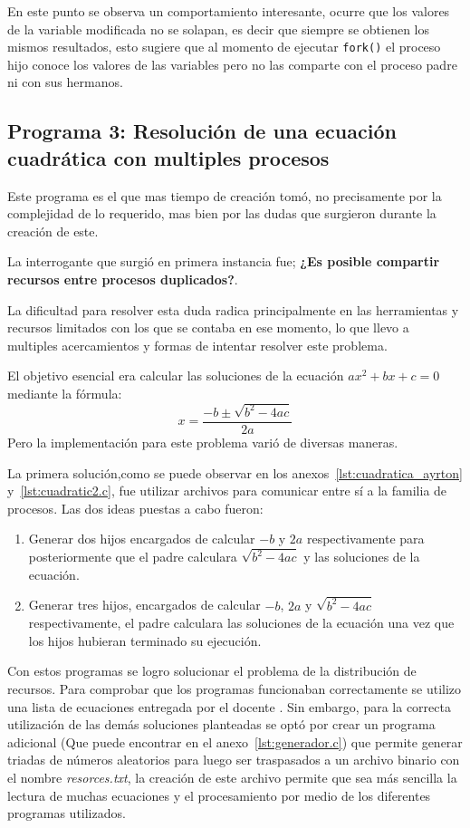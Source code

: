 En este punto se observa un comportamiento interesante, ocurre que los valores de la variable modificada no se solapan, es decir que siempre se obtienen los mismos resultados, esto sugiere que al momento de ejecutar \verb|fork()| el proceso hijo conoce los valores de las variables pero no las comparte con el proceso padre ni con sus hermanos.
\subsection{Programa 3: Resolución de una ecuación cuadrática con multiples procesos}
Este programa es el que mas tiempo de creación tomó, no precisamente por la complejidad de lo requerido, mas bien por las dudas que surgieron durante la creación de este.

La interrogante que surgió en primera instancia fue; \textbf{¿Es posible compartir recursos entre procesos duplicados?}.

La dificultad para resolver esta duda radica principalmente en las herramientas y recursos limitados con los que se contaba en ese momento, lo que llevo a multiples acercamientos y formas de intentar resolver este problema.

    El objetivo esencial era calcular las soluciones de la ecuación $ax^2+bx+c=0$ mediante la fórmula: \[x=\frac{-b\pm \sqrt{b^2-4ac}}{2a}\]Pero la implementación para este problema varió de diversas maneras.

La primera solución,como se puede observar en los anexos~\ref{lst:cuadratica_ayrton} y~\ref{lst:cuadratic2.c}, fue utilizar archivos para comunicar entre sí a la familia de procesos. Las dos ideas puestas a cabo fueron:
\begin{enumerate}
    \item Generar dos hijos encargados de calcular $-b$ y $2a$ respectivamente para posteriormente que el padre calculara $\sqrt{b^2-4ac}$ y las soluciones de la ecuación.
    \item Generar tres hijos, encargados de calcular $-b$, $2a$ y $\sqrt{b^2-4ac}$ respectivamente, el padre calculara las soluciones de la ecuación una vez que los hijos hubieran terminado su ejecución.
\end{enumerate}

Con estos programas se logro solucionar el problema de la distribución de recursos. Para comprobar que los programas funcionaban correctamente se utilizo una lista de ecuaciones entregada por el docente \docprofessor. Sin embargo, para la correcta utilización de las demás soluciones planteadas se optó por crear un programa adicional (Que puede encontrar en el anexo~\ref{lst:generador.c}) que permite generar triadas de números aleatorios para luego ser traspasados a un archivo binario con el nombre \textit{resorces.txt}, la creación de este archivo permite que sea más sencilla la lectura de muchas ecuaciones y el procesamiento por medio de los diferentes programas utilizados.

